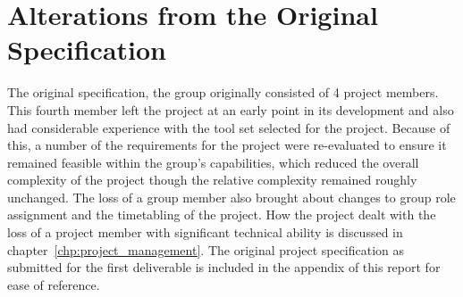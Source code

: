 \section{Alterations from the Original Specification}

    The original specification, the group originally consisted of 4 project members. This fourth member left the project at an early point in its development and also had considerable experience with the tool set selected for the project. Because of this, a number of the requirements for the project were re-evaluated to ensure it remained feasible within the group's capabilities, which reduced the overall complexity of the project though the relative complexity remained roughly unchanged. The loss of a group member also brought about changes to group role assignment and the timetabling of the project. How the project dealt with the loss of a project member with significant technical ability is discussed in chapter~\ref{chp:project_management}. The original project specification as submitted for the first deliverable is included in the appendix of this report for ease of reference.